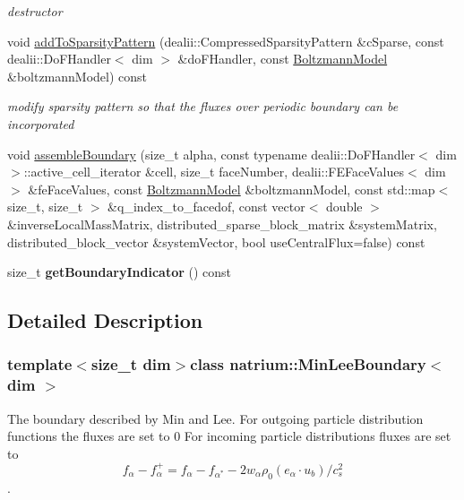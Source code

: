\begin{DoxyCompactItemize}
\begin{DoxyCompactList}\small\item\em destructor \end{DoxyCompactList}\item 
void \hyperlink{classnatrium_1_1MinLeeBoundary_a9737abb4fab0f8b6763e65d42118ab07}{add\-To\-Sparsity\-Pattern} (dealii\-::\-Compressed\-Sparsity\-Pattern \&c\-Sparse, const dealii\-::\-Do\-F\-Handler$<$ dim $>$ \&do\-F\-Handler, const \hyperlink{classnatrium_1_1BoltzmannModel}{Boltzmann\-Model} \&boltzmann\-Model) const 
\begin{DoxyCompactList}\small\item\em modify sparsity pattern so that the fluxes over periodic boundary can be incorporated \end{DoxyCompactList}\item 
void \hyperlink{classnatrium_1_1MinLeeBoundary_a4cbf4118f7344522e87027bc606b7b11}{assemble\-Boundary} (size\-\_\-t alpha, const typename dealii\-::\-Do\-F\-Handler$<$ dim $>$\-::active\-\_\-cell\-\_\-iterator \&cell, size\-\_\-t face\-Number, dealii\-::\-F\-E\-Face\-Values$<$ dim $>$ \&fe\-Face\-Values, const \hyperlink{classnatrium_1_1BoltzmannModel}{Boltzmann\-Model} \&boltzmann\-Model, const std\-::map$<$ size\-\_\-t, size\-\_\-t $>$ \&q\-\_\-index\-\_\-to\-\_\-facedof, const vector$<$ double $>$ \&inverse\-Local\-Mass\-Matrix, distributed\-\_\-sparse\-\_\-block\-\_\-matrix \&system\-Matrix, distributed\-\_\-block\-\_\-vector \&system\-Vector, bool use\-Central\-Flux=false) const 
\item 
\hypertarget{classnatrium_1_1MinLeeBoundary_a050f00caec37ee8e2f6e19a4d3d2d1fc}{size\-\_\-t {\bfseries get\-Boundary\-Indicator} () const }\label{classnatrium_1_1MinLeeBoundary_a050f00caec37ee8e2f6e19a4d3d2d1fc}

\end{DoxyCompactItemize}


\subsection{Detailed Description}
\subsubsection*{template$<$size\-\_\-t dim$>$class natrium\-::\-Min\-Lee\-Boundary$<$ dim $>$}

The boundary described by Min and Lee. For outgoing particle distribution functions the fluxes are set to 0 For incoming particle distributions fluxes are set to \[ f_{\alpha} - f^{+}_{\alpha} = f_{\alpha} - f_{\alpha^{*}} - 2w_{\alpha} \rho_{0} (e_{\alpha}\cdot u_{b})/c^{2}_{s}\]. 

